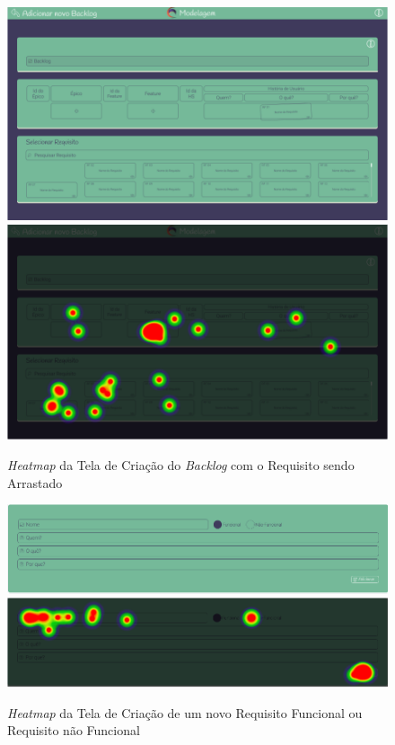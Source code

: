\begin{figure}[]
  \begin{center}
      \caption{{\textit{Heatmap} da Tela de Criação do \textit{Backlog} com o Requisito sendo Arrastado}}
      \label{fig:backlog_hm_3}
      \includegraphics[scale=0.45]{figuras/UsabilityHub/backlog/5.png}
    \includegraphics[scale=0.45]{figuras/UsabilityHub/backlog/6.png}
\end{center}
\end{figure}

\begin{figure}[H]
  \begin{center}
      \caption{{\textit{Heatmap} da Tela de Criação de um novo Requisito Funcional ou Requisito não Funcional}}
      \label{fig:backlog_hm_4}
      \includegraphics[scale=0.45]{figuras/UsabilityHub/backlog/7.png}
    \includegraphics[scale=0.45]{figuras/UsabilityHub/backlog/8.png}
\end{center}
\end{figure}

